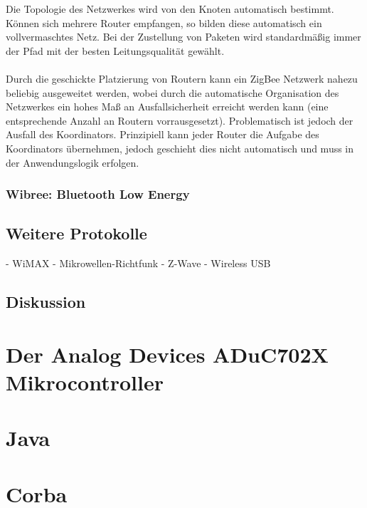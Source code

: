                 Die Topologie des Netzwerkes wird von den Knoten automatisch bestimmt. Können
                sich mehrere Router empfangen, so bilden diese automatisch ein vollvermaschtes
                Netz. Bei der Zustellung von Paketen wird standardmäßig immer der Pfad mit
                der besten Leitungsqualität gewählt.\\
                \\
                Durch die geschickte Platzierung von Routern kann ein ZigBee Netzwerk
                nahezu beliebig ausgeweitet werden, wobei durch die automatische Organisation
                des Netzwerkes ein hohes Maß an Ausfallsicherheit erreicht werden kann (eine entsprechende
                Anzahl an Routern vorrausgesetzt). Problematisch ist jedoch der Ausfall des
                Koordinators. Prinzipiell kann jeder Router die Aufgabe des Koordinators übernehmen,
                jedoch geschieht dies nicht automatisch und muss in der Anwendungslogik erfolgen.
               

        \subsubsection{Wibree: Bluetooth Low Energy}\label{wibree}
    \subsection{Weitere Protokolle}
        - WiMAX
        - Mikrowellen-Richtfunk
        - Z-Wave
        - Wireless USB

    \subsection{Diskussion}

\section{Der Analog Devices ADuC702X Mikrocontroller}
\section{Java}
\section{Corba}
